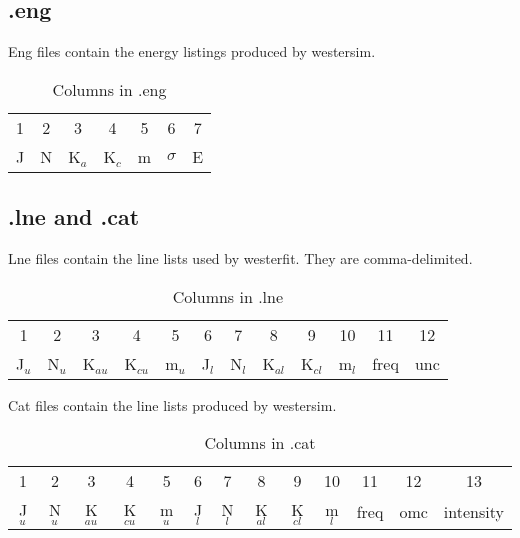 \documentclass{article}
\begin{document}
\FloatBarrier

\subsection{.eng}
	
Eng files contain the energy listings produced by westersim.

	\begin{table}[h]
		\caption{Columns in .eng}
	\begin{tabular}{c c c c c c c}
		\hline
		1 & 2 & 3 & 4 & 5 & 6 & 7 \\
		J & N & K$_a$ & K$_c$ & m & $\sigma$ & E \\
	\end{tabular}
	\end{table}
	
\subsection{.lne and .cat}

Lne files contain the line lists used by westerfit. They are comma-delimited.

	\begin{table}[h]
	\caption{Columns in .lne}
	\begin{tabular}{c c c c c c c c c c c c}
		\hline
		1 & 2 & 3 & 4 & 5 & 6 & 7 & 8 & 9 & 10 & 11 & 12 \\
		J$_u$ & N$_u$ & K$_{au}$ & K$_{cu}$ & m$_u$ & J$_l$ & N$_l$ & K$_{al}$ & K$_{cl}$ & m$_l$ & freq & unc \\
	\end{tabular}
	\end{table}


Cat files contain the line lists produced by westersim.


	\begin{table}[h]
	\caption{Columns in .cat}	
	\begin{tabular}{c c c c c c c c c c c c c}
		\hline
		1 & 2 & 3 & 4 & 5 & 6 & 7 & 8 & 9 & 10 & 11 & 12 & 13\\
		J$_u$ & N$_u$ & K$_{au}$ & K$_{cu}$ & m$_u$ & J$_l$ & N$_l$ & K$_{al}$ & K$_{cl}$ & m$_l$ & freq & omc & intensity \\
	\end{tabular}
	\end{table}
	
\end{document}

